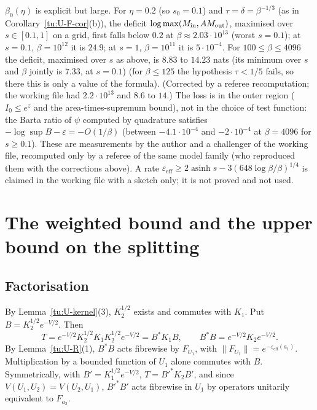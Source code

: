 \begin{remark}\label{tu:U-F-num}
$\beta_0(\eta)$ is explicit but large. For $\eta=0.2$ (so $s_0=0.1$) and $\tau=\delta=\beta^{-1/3}$ (as in
Corollary~\ref{tu:U-F-cor}(b)), the deficit $\log\max(M_{\rm in},AM_{\rm out})$, maximised
over $s\in[0.1,1]$ on a grid, first falls below $0.2$ at $\beta\approx2.03\cdot10^{13}$ (worst $s=0.1$); at $s=0.1$,
$\beta=10^{12}$ it is $24.9$; at $s=1$, $\beta=10^{11}$ it is $5\cdot10^{-4}$. For $100\le\beta\le4096$ the deficit, maximised over $s$ as above, is $8.83$ to
$14.23$ nats (its minimum over $s$ and $\beta$ jointly is $7.33$, at $s=0.1$) (for $\beta\le125$ the hypothesis $\tau<1/5$ fails, so there this is only a value of the formula). (Corrected
by a referee recomputation; the working file had $2.2\cdot10^{13}$ and $8.6$ to $14$.)
The loss is in the outer region ($I_0\le e^z$ and the area-times-supremum bound), not in the choice of test
function: the Barta ratio of $\psi$ computed by quadrature satisfies $-\log\sup B-\varepsilon=-O(1/\beta)$ (between
$-4.1\cdot10^{-4}$ and $-2\cdot10^{-4}$ at $\beta=4096$ for $s\ge0.1$). These are measurements by the author and a challenger
of the working file, recomputed only by a referee of the same model family (who reproduced them with the corrections
above). A rate $\varepsilon_{\mathrm{eff}}\ge2\operatorname{asinh}s-3(648\log\beta/\beta)^{1/4}$
is claimed in the working file with a sketch only; it is not proved and not used.
\end{remark}

\section{The weighted bound and the upper bound on the splitting}\label{tu:U-sec-agmon}

\subsection{Factorisation}
By Lemma~\ref{tu:U-kernel}(3), $K_2^{1/2}$ exists and commutes with $K_1$. Put $B=K_2^{1/2}e^{-V/2}$. Then
\begin{equation}\label{tu:U-eq-fact}
T=e^{-V/2}K_2^{1/2}K_1K_2^{1/2}e^{-V/2}=B^*K_1B ,\qquad B^*B=e^{-V/2}K_2e^{-V/2}.
\end{equation}
By Lemma~\ref{tu:U-R}(1), $B^*B$ acts fibrewise by $F_{U_1}$, with $\|F_{U_1}\|=e^{-\varepsilon_{\mathrm{eff}}(a_1)}$.
Multiplication by a bounded function of $U_1$ alone commutes with $B$. Symmetrically, with
$B'=K_1^{1/2}e^{-V/2}$, $T=B'^*K_2B'$, and since $V(U_1,U_2)=V(U_2,U_1)$, $B'^*B'$ acts fibrewise in $U_1$ by
operators unitarily equivalent to $F_{a_2}$.

